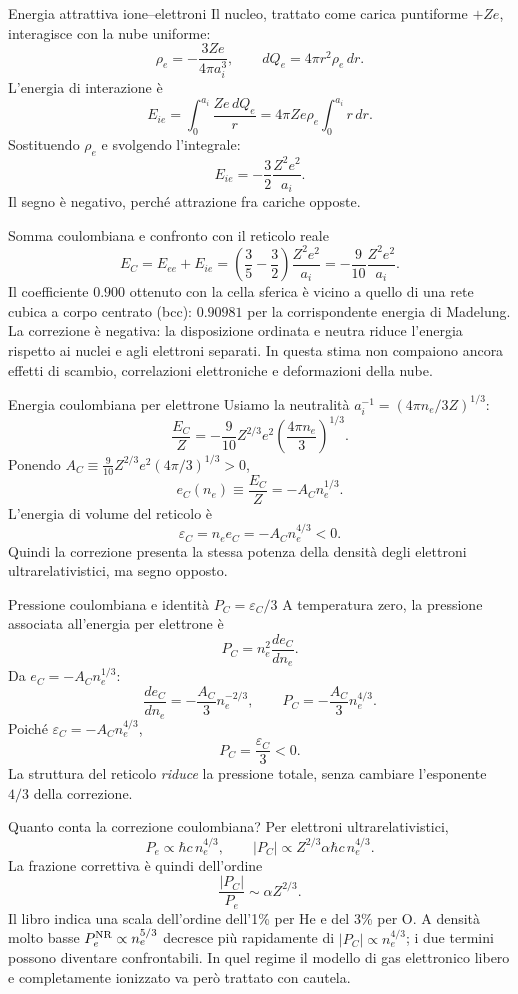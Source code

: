 \begin{frame}[t]{Energia attrattiva ione--elettroni}
\small
Il nucleo, trattato come carica puntiforme $+Ze$, interagisce con la nube uniforme:
\[
\rho_e=-\frac{3Ze}{4\pi a_i^3},\qquad dQ_e=4\pi r^2\rho_e\,dr.
\]
L'energia di interazione è
\[
E_{ie}=\int_0^{a_i}\frac{Ze\,dQ_e}{r}
=4\pi Ze\rho_e\int_0^{a_i}r\,dr.
\]
Sostituendo $\rho_e$ e svolgendo l'integrale:
\[
E_{ie}=-\frac32\frac{Z^2e^2}{a_i}.
\]
Il segno è negativo, perché attrazione fra cariche opposte.
\end{frame}

\begin{frame}[t]{Somma coulombiana e confronto con il reticolo reale}
\small
\[
E_C=E_{ee}+E_{ie}
=\left(\frac35-\frac32\right)\frac{Z^2e^2}{a_i}
=-\frac9{10}\frac{Z^2e^2}{a_i}.
\]
Il coefficiente $0.900$ ottenuto con la cella sferica è vicino a quello di una rete cubica a corpo centrato (bcc): $0.90981$ per la corrispondente energia di Madelung.
\medskip
La correzione è negativa: la disposizione ordinata e neutra riduce l'energia rispetto ai nuclei e agli elettroni separati.
\medskip
In questa stima non compaiono ancora effetti di scambio, correlazioni elettroniche e deformazioni della nube.
\end{frame}

\begin{frame}[t]{Energia coulombiana per elettrone}
\small
Usiamo la neutralità $a_i^{-1}=(4\pi n_e/3Z)^{1/3}$:
\[
\frac{E_C}Z=-\frac9{10}Z^{2/3}e^2
\left(\frac{4\pi n_e}{3}\right)^{1/3}.
\]
Ponendo $A_C\equiv\frac9{10}Z^{2/3}e^2(4\pi/3)^{1/3}>0$,
\[
e_C(n_e)\equiv\frac{E_C}Z=-A_C n_e^{1/3}.
\]
L'energia di volume del reticolo è
\[
\varepsilon_C=n_ee_C=-A_C n_e^{4/3}<0.
\]
Quindi la correzione presenta la stessa potenza della densità degli elettroni ultrarelativistici, ma segno opposto.
\end{frame}

\begin{frame}[t]{Pressione coulombiana e identità $P_C=\varepsilon_C/3$}
\small
A temperatura zero, la pressione associata all'energia per elettrone è
\[
P_C=n_e^2\frac{de_C}{dn_e}.
\]
Da $e_C=-A_Cn_e^{1/3}$:
\[
\frac{de_C}{dn_e}=-\frac{A_C}{3}n_e^{-2/3},\qquad
P_C=-\frac{A_C}{3}n_e^{4/3}.
\]
Poiché $\varepsilon_C=-A_Cn_e^{4/3}$,
\[
P_C=\frac{\varepsilon_C}{3}<0.
\]
La struttura del reticolo \emph{riduce} la pressione totale, senza cambiare l'esponente $4/3$ della correzione.
\end{frame}

\begin{frame}[t]{Quanto conta la correzione coulombiana?}
\small
Per elettroni ultrarelativistici,
\[
P_e\propto \hbar c\,n_e^{4/3},\qquad
|P_C|\propto Z^{2/3}\alpha\hbar c\,n_e^{4/3}.
\]
La frazione correttiva è quindi dell'ordine
\[
\frac{|P_C|}{P_e}\sim \alpha Z^{2/3}.
\]
Il libro indica una scala dell'ordine dell'1\% per He e del 3\% per O.
\medskip
A densità molto basse $P_e^{\rm NR}\propto n_e^{5/3}$ decresce più rapidamente di $|P_C|\propto n_e^{4/3}$; i due termini possono diventare confrontabili. In quel regime il modello di gas elettronico libero e completamente ionizzato va però trattato con cautela.
\end{frame}

